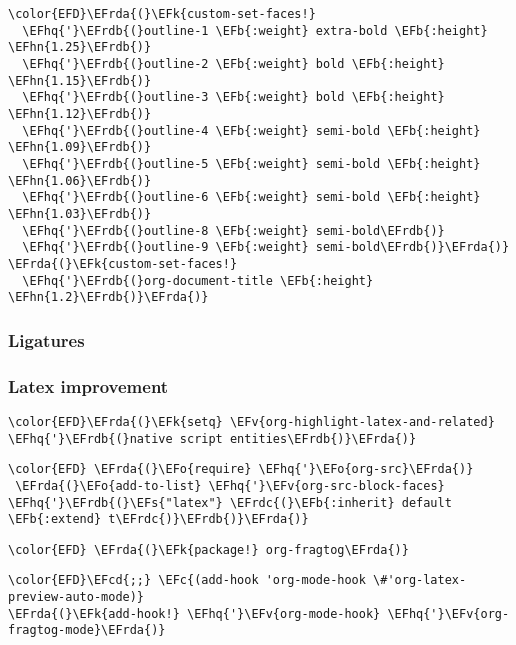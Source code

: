 \documentclass[12pt]{article}
\theoremstyle{plain}%
\theoremstyle{definition}
\theoremstyle{remark}
\newcommand{\EFc}[1]{\textcolor{EFc}{#1}} %
\newcommand{\EFcd}[1]{\textcolor{EFcd}{#1}} %
\newcommand{\EFs}[1]{\textcolor{EFs}{#1}} %
\newcommand{\EFk}[1]{\textcolor{EFk}{#1}} %
\newcommand{\EFb}[1]{\textcolor{EFb}{#1}} %
\newcommand{\EFv}[1]{\textcolor{EFv}{#1}} %
\newcommand{\EFo}[1]{\textcolor{EFo}{#1}} %
\newcommand{\EFhn}[1]{\textcolor{EFhn}{\textbf{#1}}} %
\newcommand{\EFhq}[1]{\textcolor{EFhq}{#1}} %
\newcommand{\EFrda}[1]{\textcolor{EFrda}{#1}} %
\newcommand{\EFrdb}[1]{\textcolor{EFrdb}{#1}} %
\newcommand{\EFrdc}[1]{\textcolor{EFrdc}{#1}} %
\begin{document}
\begin{Code}
\begin{Verbatim}
\color{EFD}\EFrda{(}\EFk{custom-set-faces!}
  \EFhq{'}\EFrdb{(}outline-1 \EFb{:weight} extra-bold \EFb{:height} \EFhn{1.25}\EFrdb{)}
  \EFhq{'}\EFrdb{(}outline-2 \EFb{:weight} bold \EFb{:height} \EFhn{1.15}\EFrdb{)}
  \EFhq{'}\EFrdb{(}outline-3 \EFb{:weight} bold \EFb{:height} \EFhn{1.12}\EFrdb{)}
  \EFhq{'}\EFrdb{(}outline-4 \EFb{:weight} semi-bold \EFb{:height} \EFhn{1.09}\EFrdb{)}
  \EFhq{'}\EFrdb{(}outline-5 \EFb{:weight} semi-bold \EFb{:height} \EFhn{1.06}\EFrdb{)}
  \EFhq{'}\EFrdb{(}outline-6 \EFb{:weight} semi-bold \EFb{:height} \EFhn{1.03}\EFrdb{)}
  \EFhq{'}\EFrdb{(}outline-8 \EFb{:weight} semi-bold\EFrdb{)}
  \EFhq{'}\EFrdb{(}outline-9 \EFb{:weight} semi-bold\EFrdb{)}\EFrda{)}
\EFrda{(}\EFk{custom-set-faces!}
  \EFhq{'}\EFrdb{(}org-document-title \EFb{:height} \EFhn{1.2}\EFrdb{)}\EFrda{)}
\end{Verbatim}
\end{Code}

\subsubsection{Ligatures}
\label{sec:org8af051d}
\subsubsection{Latex improvement}
\label{sec:orgad33dc1}
\begin{Code}
\begin{Verbatim}
\color{EFD}\EFrda{(}\EFk{setq} \EFv{org-highlight-latex-and-related} \EFhq{'}\EFrdb{(}native script entities\EFrdb{)}\EFrda{)}
\end{Verbatim}
\end{Code}
\begin{Code}
\begin{Verbatim}
\color{EFD} \EFrda{(}\EFo{require} \EFhq{'}\EFo{org-src}\EFrda{)}
 \EFrda{(}\EFo{add-to-list} \EFhq{'}\EFv{org-src-block-faces} \EFhq{'}\EFrdb{(}\EFs{"latex"} \EFrdc{(}\EFb{:inherit} default \EFb{:extend} t\EFrdc{)}\EFrdb{)}\EFrda{)}
\end{Verbatim}
\end{Code}
\begin{Code}
\begin{Verbatim}
\color{EFD} \EFrda{(}\EFk{package!} org-fragtog\EFrda{)}
\end{Verbatim}
\end{Code}
\begin{Code}
\begin{Verbatim}
\color{EFD}\EFcd{;;} \EFc{(add-hook 'org-mode-hook \#'org-latex-preview-auto-mode)}
\EFrda{(}\EFk{add-hook!} \EFhq{'}\EFv{org-mode-hook} \EFhq{'}\EFv{org-fragtog-mode}\EFrda{)}
\end{Verbatim}
\end{Code}
\end{document}
